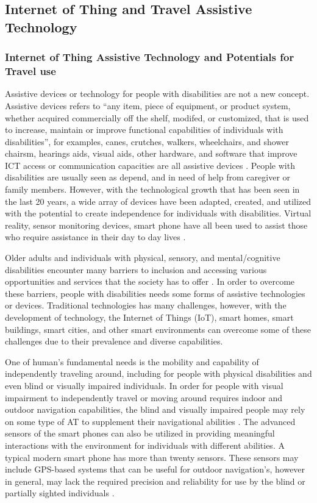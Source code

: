 \subsection{Internet of Thing and Travel Assistive Technology}
\subsubsection{Internet of Thing Assistive Technology and Potentials for Travel use}
Assistive devices or technology for people with disabilities are not a new concept. Assistive devices refers to ``any item, piece of equipment, or product system, whether acquired commercially off the shelf, modifed, or customized, that is used to increase, maintain or improve functional capabilities of individuals with disabilities'', for examples, canes, crutches, walkers, wheelchairs, and shower chairsm, hearings aids, visual aids, other hardware, and software that improve ICT access or
communication capacities are all assistive devices \cite{Barbeau, Shah}. People with disabilities are usually seen as depend, and in need of help from caregiver or family members. However, with the technological growth that has been seen in the last 20 years, a wide array of devices have been adapted, created, and utilized with the potential to create independence for individuals with disabilities. Virtual reality, sensor monitoring devices, smart phone have all been used to assist those who require assistance in their day to day lives \cite{moya2016dynamic}.  

Older adults and individuals with physical, sensory, and mental/cognitive disabilities encounter many barriers to inclusion and accessing various opportunities and services that the society has to offer \cite{Shah}. In order to overcome these barriers, people with disabilities needs some forms of assistive technologies or devices. Traditional technologies has many challenges, however,  with the development of technology, the Internet of Things (IoT), smart homes, smart buildings,
smart cities, and other smart environments can overcome some of these challenges due to their prevalence and diverse capabilities.

One of human's fundamental needs is the mobility and capability of independently traveling around, including for people with physical disabilities and even blind or visually impaired individuals. In order for people with visual impairment to independently travel or moving around requires indoor and outdoor navigation capabilities, the blind and visually impaired people may rely on some type of AT to supplement their navigational abilities \cite{Shah}. The advanced sensors of the smart phones can also be utilized in providing meaningful interactions with the environment for individuals with different abilities. A typical modern smart phone has more than twenty sensors. These sensors may include GPS-based systems that can be useful for outdoor navigation's, however in general, may lack the required precision and reliability for use by the blind or partially sighted individuals \cite{Shah}. 

